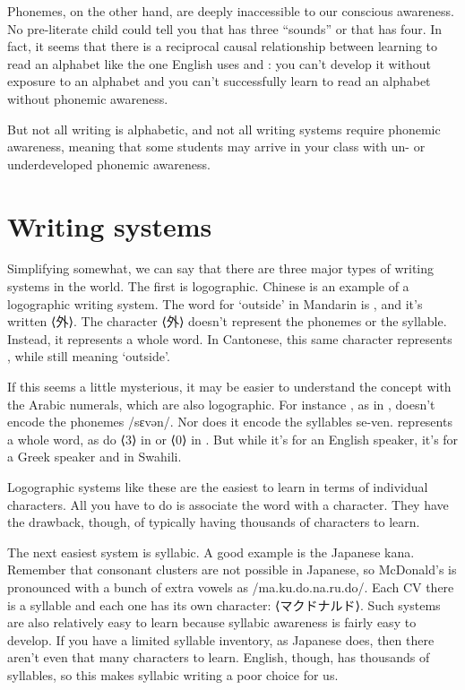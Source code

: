 Phonemes, on the other hand, are deeply inaccessible to our conscious awareness. No pre-literate child could tell you that  has three ``sounds'' or that  has four. In fact, it seems that there is a reciprocal causal relationship between learning to read an alphabet like the one English uses and : you can't develop it without exposure to an alphabet and you can't successfully learn to read an alphabet without phonemic awareness.

But not all writing is alphabetic, and not all writing systems require phonemic awareness, meaning that some students may arrive in your class with un- or underdeveloped phonemic awareness.

\section{Writing systems}
Simplifying somewhat, we can say that there are three major types of writing systems in the world. The first is logographic. Chinese is an example of a logographic writing system. The word for `outside' in Mandarin is , and it's written ⟨外⟩. The character ⟨外⟩ doesn't represent the phonemes or the syllable. Instead, it represents a whole word. In Cantonese, this same character represents , while still meaning `outside'.

If this seems a little mysterious, it may be easier to understand the concept with the Arabic numerals, which are also logographic. For instance , as in , doesn't encode the phonemes /sɛvən/. Nor does it encode the syllables se-ven.  represents a whole word, as do ⟨3⟩ in  or ⟨0⟩ in . But while it's  for an English speaker, it's  for a Greek speaker and  in Swahili.

Logographic systems like these are the easiest to learn in terms of individual characters. All you have to do is associate the word with a character. They have the drawback, though, of typically having thousands of characters to learn.

The next easiest system is syllabic. A good example is the Japanese kana. Remember that consonant clusters are not possible in Japanese, so McDonald's is pronounced with a bunch of extra vowels as /ma.ku.do.na.ru.do/. Each CV there is a syllable and each one has its own character: ⟨マクドナルド⟩. Such systems are also relatively easy to learn because syllabic awareness is fairly easy to develop. If you have a limited syllable inventory, as Japanese does, then there aren't even that many characters to learn. English, though, has thousands of syllables, so this makes syllabic writing a poor choice for us.

